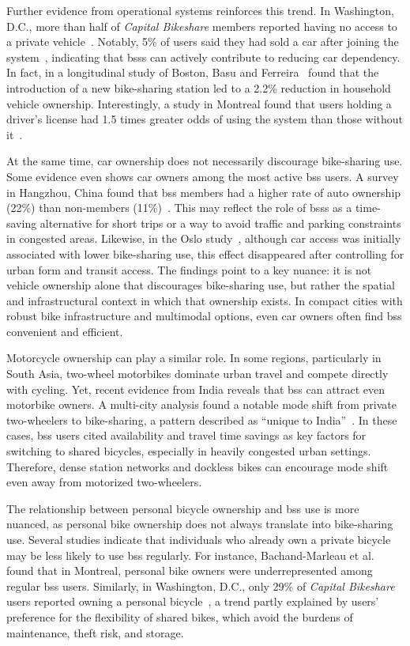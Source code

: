     Further evidence from operational systems reinforces this trend. In Washington, D.C., more than half of \textit{Capital Bikeshare} members reported having no access to a private vehicle~\cite{CapitalBikeshare2013}. Notably, 5\% of users said they had sold a car after joining the system~\cite{CapitalBikeshare2013}, indicating that \acp{bss} can actively contribute to reducing car dependency. In fact, in a longitudinal study of Boston, Basu and Ferreira~\cite{Basu2021} found that the introduction of a new bike-sharing station led to a 2.2\% reduction in household vehicle ownership. Interestingly, a study in Montreal found that users holding a driver’s license had 1.5 times greater odds of using the system than those without it~\cite{BachandMarleau2012}. 

    At the same time, car ownership does not necessarily discourage bike-sharing use. Some evidence even shows car owners among the most active \ac{bss} users. A survey in Hangzhou, China found that \ac{bss} members had a higher rate of auto ownership (22\%) than non-members (11\%)~\cite{Shaheen2011_worldwide}. This may reflect the role of \acp{bss} as a time-saving alternative for short trips or a way to avoid traffic and parking constraints in congested areas. Likewise, in the Oslo study~\cite{Mouratidis2022}, although car access was initially associated with lower bike-sharing use, this effect disappeared after controlling for urban form and transit access. The findings point to a key nuance: it is not vehicle ownership alone that discourages bike-sharing use, but rather the spatial and infrastructural context in which that ownership exists. In compact cities with robust bike infrastructure and multimodal options, even car owners often find \ac{bss} convenient and efficient.

    Motorcycle ownership can play a similar role. In some regions, particularly in South Asia, two-wheel motorbikes dominate urban travel and compete directly with cycling. Yet, recent evidence from India reveals that \ac{bss} can attract even motorbike owners. A multi-city analysis found a notable mode shift from private two-wheelers to bike-sharing, a pattern described as “unique to India”~\cite{TUMI2023}. In these cases, \ac{bss} users cited availability and travel time savings as key factors for switching to shared bicycles, especially in heavily congested urban settings. Therefore, dense station networks and dockless bikes can encourage mode shift even away from motorized two-wheelers.

    The relationship between personal bicycle ownership and \ac{bss} use is more nuanced, as personal bike ownership does not always translate into bike-sharing use. Several studies indicate that individuals who already own a private bicycle may be less likely to use \ac{bss} regularly. For instance, Bachand-Marleau et al.~\cite{BachandMarleau2012} found that in Montreal, personal bike owners were underrepresented among regular \ac{bss} users. Similarly, in Washington, D.C., only 29\% of \textit{Capital Bikeshare} users reported owning a personal bicycle~\cite{Buck2013}, a trend partly explained by users' preference for the flexibility of shared bikes, which avoid the burdens of maintenance, theft risk, and storage.


